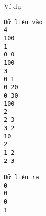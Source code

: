 Ví dụ
\begin{verbatim}
Dữ liệu vào
4
100
1
0 0 
100
3
0 1
0 20
0 30 
100
2
2 3
3 2
10
2
1 2 
2 3	

Dữ liệu ra
0
0
0
1
\end{verbatim}